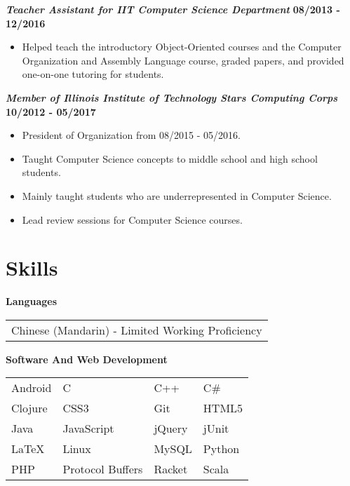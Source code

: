 \documentclass[10pt]{res}
\begin{document}
\begin{resume}
	\textbf{\textit{Teacher Assistant for IIT Computer Science Department}} 
	\vspace*{.25em}
	\hfill {\bf 08/2013 - 12/2016}
	\begin{itemize}
	  \item Helped teach the introductory Object-Oriented courses and the Computer Organization and Assembly Language course, graded papers, and provided one-on-one tutoring for students. 
	\end{itemize}
	
	\textbf{\textit{Member of Illinois Institute of Technology Stars Computing Corps}}
	\vspace*{.25em}
	\hfill {\bf 10/2012 - 05/2017}
	\begin{itemize}
  \setlength\itemsep{0em}
	  \item President of Organization from 08/2015 - 05/2016.
	  \item Taught Computer Science concepts to middle school and high school students.  
	  \item Mainly taught students who are underrepresented in Computer Science.
	  \item Lead review sessions for Computer Science courses.
	\end{itemize}
	
\section{Skills}
\textbf{Languages} \\ 
	\begin{tabular}{ l }
		Chinese (Mandarin) - Limited Working Proficiency
	\end{tabular}
	
	\vspace{1pt}
\textbf{Software And Web Development} \\
	\begin{tabular}{  l    l    l    l  }
		Android	           &   C 	     			    	&   C++ 			&   C\# 	\\ 
		Clojure 			& 	CSS3 	 			& 	Git	 			& 	HTML5 \\
	     Java  				& 	JavaScript 			&	jQuery            &   jUnit  	 \\
		LaTeX   			&   Linux 				&	MySQL 			&	Python   \\    	
		PHP  	 			&	Protocol Buffers   	& 	Racket         	&	Scala							
	\end{tabular}
\end{resume}
\end{document}
